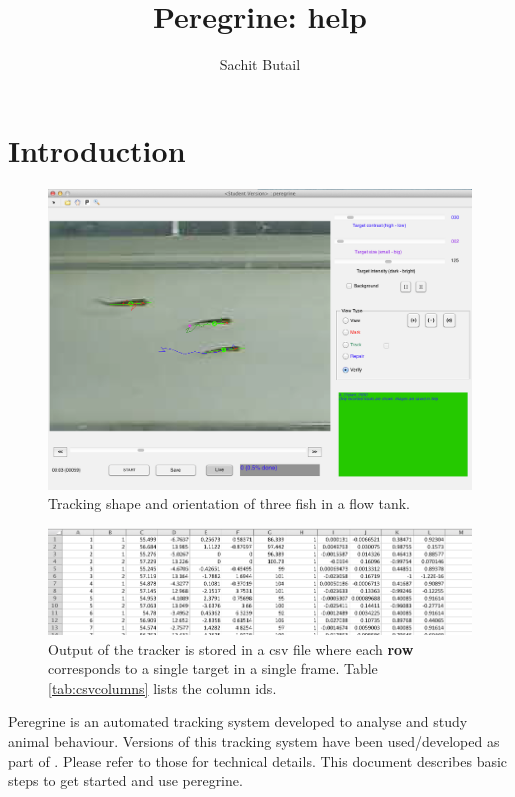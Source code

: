 \documentclass[12pt]{article}
\title{Peregrine: help}
\author{Sachit Butail}
\date{}
\begin{document}
\maketitle
\thispagestyle{empty}
\pagestyle{empty}



\section{Introduction}
\begin{figure}[ht]
\centering
\includegraphics[width=.995\linewidth]{screenshot}
\caption{Tracking shape and orientation of three fish in a flow tank.}
\label{fig:sample_tracks}
\end{figure}

\begin{figure}[ht]
\centering
\includegraphics[width=.995\linewidth]{output}
\caption{Output of the tracker is stored in a csv file where each \textbf{row} corresponds to a single target in a single frame. Table \ref{tab:csvcolumns} lists the column ids. }
\label{fig:output}
\end{figure}
Peregrine is an automated tracking system developed to analyse and study animal behaviour. Versions of this tracking system have been used/developed as part of \cite{Butail2011,Butail2012b,Butail2012c, Butail2013c, Ladu2014, Bartolini2014}. Please refer to those for technical details. This document describes basic steps to get started and use peregrine. 
\end{document}
